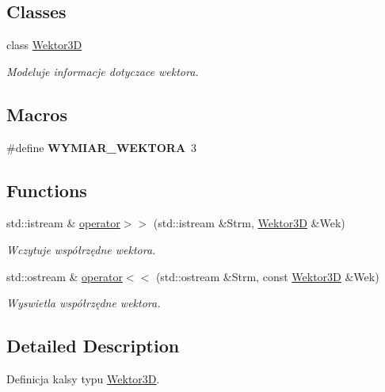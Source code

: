 \subsection*{Classes}
\begin{DoxyCompactItemize}
\item 
class \hyperlink{class_wektor3_d}{Wektor3\+D}
\begin{DoxyCompactList}\small\item\em Modeluje informacje dotyczace wektora. \end{DoxyCompactList}\end{DoxyCompactItemize}
\subsection*{Macros}
\begin{DoxyCompactItemize}
\item 
\hypertarget{_wektor3_d_8hh_a837652d626680cf1da4d0b5309b1e80a}{\#define {\bfseries W\+Y\+M\+I\+A\+R\+\_\+\+W\+E\+K\+T\+O\+R\+A}~3}\label{_wektor3_d_8hh_a837652d626680cf1da4d0b5309b1e80a}

\end{DoxyCompactItemize}
\subsection*{Functions}
\begin{DoxyCompactItemize}
\item 
std\+::istream \& \hyperlink{_wektor3_d_8hh_a1075392800748e0563d8b2c02640a458}{operator$>$$>$} (std\+::istream \&Strm, \hyperlink{class_wektor3_d}{Wektor3\+D} \&Wek)
\begin{DoxyCompactList}\small\item\em Wczytuje współrzędne wektora. \end{DoxyCompactList}\item 
std\+::ostream \& \hyperlink{_wektor3_d_8hh_a55d3a49ea2a060a1d4712feb3811e68e}{operator$<$$<$} (std\+::ostream \&Strm, const \hyperlink{class_wektor3_d}{Wektor3\+D} \&Wek)
\begin{DoxyCompactList}\small\item\em Wyswietla współrzędne wektora. \end{DoxyCompactList}\end{DoxyCompactItemize}


\subsection{Detailed Description}
Definicja kalsy typu \hyperlink{class_wektor3_d}{Wektor3\+D}. 

